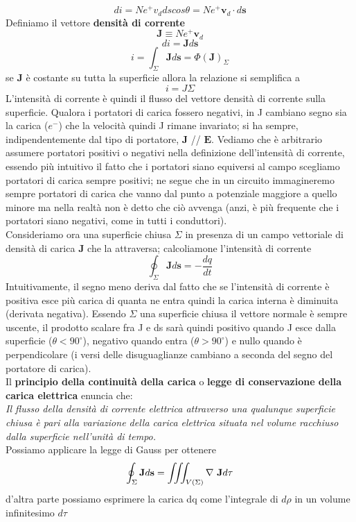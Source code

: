 \documentclass[
10pt, %
a4paper, %
oneside, %
headinclude,footinclude, %
BCOR5mm, %
]{scrartcl}
\begin{document}
\[di = N e^+ v_d ds cos\theta = N e^+ \mathbf{v}_d\cdot d\mathbf{s}\]
Definiamo il vettore \textbf{densità di corrente}
\[\mathbf{J} \equiv N e^+ \mathbf{v}_d\]
\[di = \mathbf{J}d\mathbf{s}\]
\[i = \int_{\Sigma} \mathbf{J}d\mathbf{s} = \Phi(\mathbf{J})_\Sigma\]
se \(\mathbf{J}\) è costante su tutta la superficie allora la relazione si semplifica a 
\[i = J\Sigma\]
L'intensità di corrente è quindi il flusso del vettore densità di corrente sulla superficie. Qualora i portatori di carica fossero negativi, in J cambiano segno sia la carica (\(e^-\)) che la velocità quindi J rimane invariato; si ha sempre, indipendentemente dal tipo di portatore, \(\mathbf{J}\) // $\mathbf{E}$. Vediamo che è arbitrario assumere portatori positivi o negativi nella definizione dell'intensità di corrente, essendo più intuitivo il fatto che i portatori siano equiversi al campo scegliamo portatori di carica sempre positivi; ne segue che in un circuito immagineremo sempre portatori di carica che vanno dal punto a potenziale maggiore a quello minore ma nella realtà non è detto che ciò avvenga (anzi, è più frequente che i portatori siano negativi, come in tutti i conduttori). \\
Consideriamo ora una superficie chiusa $\Sigma$ in presenza di un campo vettoriale di densità di carica $\mathbf{J}$ che la attraversa; calcoliamone l'intensità di corrente
\[\oint_\Sigma \mathbf{J}d\mathbf{s} = -\frac{dq}{dt}\]
Intuitivamente, il segno meno deriva dal fatto che se l'intensità di corrente è positiva esce più carica di quanta ne entra quindi la carica interna è diminuita (derivata negativa). Essendo $\Sigma$ una superficie chiusa il vettore normale è sempre uscente, il prodotto scalare fra J e ds sarà quindi positivo quando J esce dalla superficie ($\theta<90^\circ$), negativo quando entra ($\theta>90^\circ$) e nullo quando è perpendicolare (i versi delle disuguaglianze cambiano a seconda del segno del portatore di carica).\\
Il \textbf{principio della continuità della carica} o \textbf{legge di conservazione della carica elettrica} enuncia che:\\
\textit{Il flusso della densità di corrente elettrica attraverso una qualunque superficie chiusa è pari alla variazione della carica elettrica situata nel volume racchiuso dalla superficie nell'unità di tempo.}\\
Possiamo applicare la legge di Gauss per ottenere
\[\oint_\Sigma \mathbf{J}d\mathbf{s} = \iiint_{V(\Sigma)} \mathbf{\nabla\ }\mathbf{J} d\tau\]
d'altra parte possiamo esprimere la carica dq come l'integrale di \(d\rho\) in un volume infinitesimo \(d\tau\) 
\end{document}
